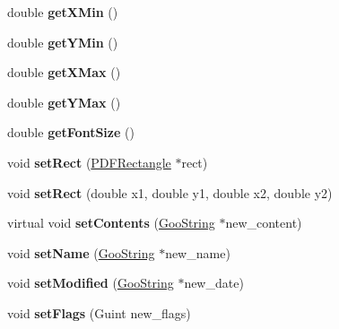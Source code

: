\begin{DoxyCompactItemize}
\mbox{\label{class_annot_a419ec1b5c9518b29bbdd63c2be0c8446}} 
double {\bfseries get\+X\+Min} ()
\item 
\mbox{\label{class_annot_a6ecc9be1b2c8e403c2a37f7713be89dd}} 
double {\bfseries get\+Y\+Min} ()
\item 
\mbox{\label{class_annot_a446db454b42e2d042f60c6a5ff22736c}} 
double {\bfseries get\+X\+Max} ()
\item 
\mbox{\label{class_annot_a1080785cc8099aa732ea0013e976a58c}} 
double {\bfseries get\+Y\+Max} ()
\item 
\mbox{\label{class_annot_a2d95384411d013e6063b5c8e716f25e0}} 
double {\bfseries get\+Font\+Size} ()
\item 
\mbox{\label{class_annot_a11f3f08fed7b03c805e69cf3de7a52cd}} 
void {\bfseries set\+Rect} (\hyperlink{class_p_d_f_rectangle}{P\+D\+F\+Rectangle} $\ast$rect)
\item 
\mbox{\label{class_annot_af2aea617b721d3608f600286063298fe}} 
void {\bfseries set\+Rect} (double x1, double y1, double x2, double y2)
\item 
\mbox{\label{class_annot_a64183b0d26c3e42b71c00e41b5ef9ca1}} 
virtual void {\bfseries set\+Contents} (\hyperlink{class_goo_string}{Goo\+String} $\ast$new\+\_\+content)
\item 
\mbox{\label{class_annot_aab23aae10a54d7925d58e18cbc42e3f2}} 
void {\bfseries set\+Name} (\hyperlink{class_goo_string}{Goo\+String} $\ast$new\+\_\+name)
\item 
\mbox{\label{class_annot_ad90e80c73dbae524a59cf05ddf7df80b}} 
void {\bfseries set\+Modified} (\hyperlink{class_goo_string}{Goo\+String} $\ast$new\+\_\+date)
\item 
\mbox{\label{class_annot_a5b0bdfb672fb75b5f092a1963504ecd3}} 
void {\bfseries set\+Flags} (Guint new\+\_\+flags)
\item 
\mbox{\label{class_annot_a6e2e9b5220b84718002fc25a290e0baa}} 

\end{DoxyCompactItemize}
